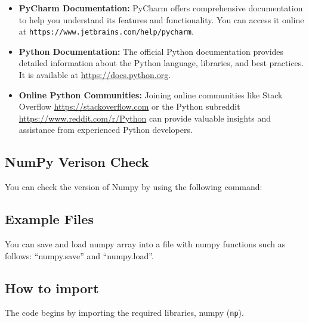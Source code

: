 \begin{itemize}
	
	\item \textbf{PyCharm Documentation:} PyCharm offers comprehensive documentation to help you understand its features and functionality. You can access it online at \texttt{https://www.jetbrains.com/help/pycharm}.
	
	\item \textbf{Python Documentation:} The official Python documentation provides detailed information about the Python language, libraries, and best practices. It is available at \url{https://docs.python.org}.
	
	\item \textbf{Online Python Communities:} Joining online communities like Stack Overflow \url{https://stackoverflow.com} or the Python subreddit \url{https://www.reddit.com/r/Python} can provide valuable insights and assistance from experienced Python developers.
	
\end{itemize}

\subsection{NumPy Verison Check}
You can check the version of Numpy by using the following command:

\begin{code}[h!]
	    
	\caption{Version Check}
\end{code}	

\subsection{Example Files}
You can save and load numpy array into a file with numpy functions such as follows: “numpy.save” and “numpy.load”.

\begin{code}[h!]
	    
	\caption{NumPy-Example Files}
\end{code}		

\subsection{How to import}
The code begins by importing the required libraries, numpy (\texttt{np}).

